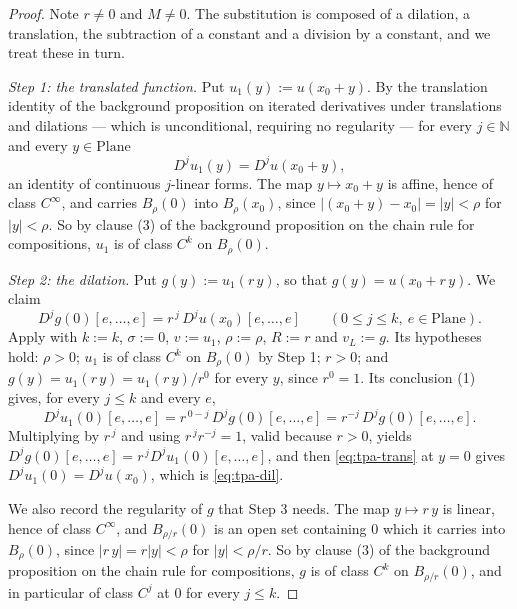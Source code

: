 \begin{proof}
Note $r\ne0$ and $M\ne0$.  The substitution is composed of a dilation, a translation, the
subtraction of a constant and a division by a constant, and we treat these in turn.

\medskip\noindent\emph{Step 1: the translated function.}
Put $u_1(y):=u(x_0+y)$.  By the translation identity of the background proposition on iterated
derivatives under translations and dilations --- which is unconditional, requiring no
regularity --- for every $j\in\mathbb{N}$ and every $y\in\mathrm{Plane}$
\begin{equation}\label{eq:tpa-trans}
  D^{j}u_1(y)=D^{j}u(x_0+y),
\end{equation}
an identity of continuous $j$-linear forms.  The map $y\mapsto x_0+y$ is affine, hence of class
$C^{\infty}$, and carries $B_{\rho}(0)$ into $B_{\rho}(x_0)$, since
$\lvert (x_0+y)-x_0\rvert=\lvert y\rvert<\rho$ for $\lvert y\rvert<\rho$.  So by clause (3) of
the background proposition on the chain rule for compositions, $u_1$ is of class $C^{k}$ on
$B_{\rho}(0)$.

\medskip\noindent\emph{Step 2: the dilation.}
Put $g(y):=u_1(r\,y)$, so that $g(y)=u(x_0+r\,y)$.  We claim
\begin{equation}\label{eq:tpa-dil}
  D^{j}g(0)[e,\ldots,e]=r^{\,j}\,D^{j}u(x_0)[e,\ldots,e]
  \qquad(0\le j\le k,\ e\in\mathrm{Plane}).
\end{equation}
Apply  with $k:=k$, $\sigma:=0$, $v:=u_1$, $\rho:=\rho$, $R:=r$ and
$v_L:=g$.  Its hypotheses hold: $\rho>0$; $u_1$ is of class $C^{k}$ on $B_{\rho}(0)$ by Step 1;
$r>0$; and $g(y)=u_1(r\,y)=u_1(r\,y)/r^{0}$ for every $y$, since $r^{0}=1$.  Its conclusion (1)
gives, for every $j\le k$ and every $e$,
\[
  D^{j}u_1(0)[e,\ldots,e]=r^{\,0-j}\,D^{j}g(0)[e,\ldots,e]=r^{-j}\,D^{j}g(0)[e,\ldots,e].
\]
Multiplying by $r^{\,j}$ and using $r^{\,j}r^{-j}=1$, valid because $r>0$, yields
$D^{j}g(0)[e,\ldots,e]=r^{\,j}D^{j}u_1(0)[e,\ldots,e]$, and then \eqref{eq:tpa-trans} at $y=0$
gives $D^{j}u_1(0)=D^{j}u(x_0)$, which is \eqref{eq:tpa-dil}.

We also record the regularity of $g$ that Step 3 needs.  The map $y\mapsto r\,y$ is linear,
hence of class $C^{\infty}$, and $B_{\rho/r}(0)$ is an open set containing $0$ which it carries
into $B_{\rho}(0)$, since $\lvert r\,y\rvert=r\lvert y\rvert<\rho$ for $\lvert y\rvert<\rho/r$.
So by clause (3) of the background proposition on the chain rule for compositions, $g$ is of
class $C^{k}$ on $B_{\rho/r}(0)$, and in particular of class $C^{j}$ at $0$ for every $j\le k$.


\end{proof}
